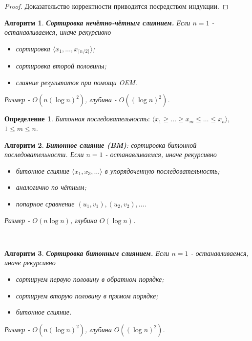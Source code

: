 \documentclass[a4paper]{article}
\theoremstyle{indented}
\newtheorem{alg}{Алгоритм}
\theoremstyle{definition}
\newtheorem{defn}{Определение}
\theoremstyle{remark}
\begin{document}
\begin{proof}
    Доказательство корректности приводится посредством индукции.
\end{proof}

\begin{alg}
    \textbf{Сортировка нечётно-чётным слиянием.} Если $n=1$ - останавливаемся, иначе рекурсивно

    \begin{itemize}
        \item сортировка $\langle x_1, \ldots, x_{\lceil n/2 \rceil} \rangle$; 
        \item сортировка второй половины; 
        \item слияние результатов при помощи OEM.
    \end{itemize}

    Размер - $O(n(\log n)^2)$, глубина - $O((\log n)^2)$.
\end{alg}

\begin{defn}
    \textit{Битонная последовательность}: $\langle x_1 \geq \ldots \geq x_m \leq \ldots \leq x_n \rangle$, $1\leq m \leq n$.
\end{defn}

\begin{alg}
    \textbf{Битонное слияние (BM)}: сортировка битонной последовательности. Если $n=1$ - останавливаемся, иначе рекурсивно

    \begin{itemize}
        \item битонное слияние $\langle x_1, x_3, \ldots \rangle $ в упорядоченную последовательность; 
        \item аналогично по чётным; 
        \item попарное сравнение $(u_1, v_1), (u_2, v_2), \ldots$. 
    \end{itemize}

    Размер - $O(n \log n)$, глубина $O(\log n)$. 
\end{alg} \ 

\begin{alg}
    \textbf{Сортировка битонным слиянием.} Если $n=1$ - останавливаемся, иначе рекурсивно

    \begin{itemize}
        \item сортируем первую половину в обратном порядке; 
        \item сортируем вторую половину в прямом порядке; 
        \item битонное слияние.
    \end{itemize}

    Размер - $O(n(\log n)^2)$, глубина $O((\log n)^2)$.
\end{alg}
\end{document}
